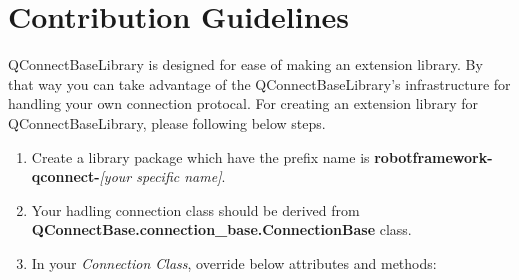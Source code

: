 \hypertarget{description-contribution-guidelines}{%
\section{Contribution Guidelines}\label{description-contribution-guidelines}}

QConnectBaseLibrary is designed for ease of making an extension library.
By that way you can take advantage of the QConnectBaseLibrary's
infrastructure for handling your own connection protocal. For creating
an extension library for QConnectBaseLibrary, please following below
steps.

\begin{enumerate}
\def\labelenumi{\arabic{enumi}.}
\tightlist
\item
  Create a library package which have the prefix name is
  \textbf{robotframework-qconnect-}\emph{{[}your specific name{]}}.
\item
  Your hadling connection class should be derived from
  \textbf{QConnectBase.connection\_base.ConnectionBase} class.
\item
  In your \emph{Connection Class}, override below attributes and
  methods:
\end{enumerate}

